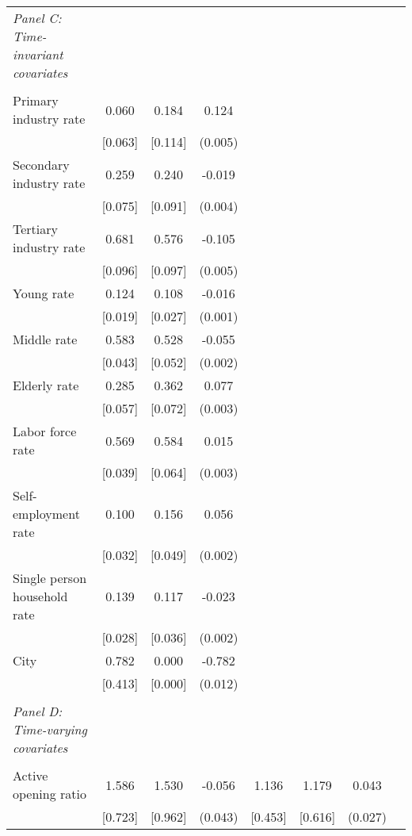 \begin{tabular}{l*{7}{c}}
\\ \multicolumn{1}{l}{\textit{Panel C: Time-invariant covariates}} \\\\[-1ex]
Primary industry rate&       0.060&       0.184&       0.124\\
                    &     [0.063]&     [0.114]&     (0.005)\\
Secondary industry rate&       0.259&       0.240&      -0.019\\
                    &     [0.075]&     [0.091]&     (0.004)\\
Tertiary industry rate&       0.681&       0.576&      -0.105\\
                    &     [0.096]&     [0.097]&     (0.005)\\
Young rate          &       0.124&       0.108&      -0.016\\
                    &     [0.019]&     [0.027]&     (0.001)\\
Middle rate         &       0.583&       0.528&      -0.055\\
                    &     [0.043]&     [0.052]&     (0.002)\\
Elderly rate        &       0.285&       0.362&       0.077\\
                    &     [0.057]&     [0.072]&     (0.003)\\
Labor force rate    &       0.569&       0.584&       0.015\\
                    &     [0.039]&     [0.064]&     (0.003)\\
Self-employment rate&       0.100&       0.156&       0.056\\
                    &     [0.032]&     [0.049]&     (0.002)\\
Single person household rate&       0.139&       0.117&      -0.023\\
                    &     [0.028]&     [0.036]&     (0.002)\\
City                &       0.782&       0.000&      -0.782\\
                    &     [0.413]&     [0.000]&     (0.012)\\
\\ \multicolumn{1}{l}{\textit{Panel D: Time-varying covariates}} \\\\[-1ex]
Active opening ratio&       1.586&       1.530&      -0.056&       1.136&       1.179&       0.043\\
                    &     [0.723]&     [0.962]&     (0.043)&     [0.453]&     [0.616]&     (0.027)\\

\end{tabular}
